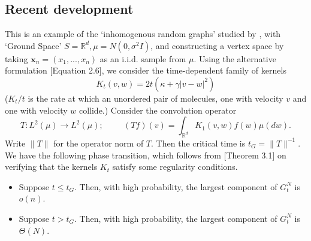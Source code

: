 \subsection{Recent development}
   This is an example of the `inhomogenous random graphs' studied by \cite{BJR07}, with `Ground Space' $S=\mathbb{R}^d, \mu=N(0,\sigma^2I)$, and constructing a vertex space by taking $\mathbf{x}_n=(x_1,...,x_n)$ as an i.i.d. sample from $\mu.$ Using the alternative formulation \cite{BJR07}[Equation 2.6], we consider the time-dependent family of kernels
   \begin{equation}
       K_t(v,w)=2t(\kappa+\gamma|v-w|^2)
   \end{equation}
   ($K_t/t$ is the rate at which an unordered pair of molecules, one with velocity $v$ and one with velocity $w$ collide.)
   Consider the convolution operator \begin{equation}\label{eq: T original}
       T: L^2(\mu)\rightarrow L^2(\mu); \hspace{1cm} (T f)(v)=\int_{\mathbb{R}^d} K_1(v,w)f(w)\mu(dw). 
   \end{equation} Write $\|T\|$ for the operator norm of $T$. Then the critical time is $t_G=\|T\|^{-1}.$ We have the following phase transition, which follows from \cite{BJR07}[Theorem 3.1] on verifying that the kernels $K_t$ satisfy some regularity conditions.  \begin{theorem} \begin{itemize}
       \item Suppose $t\leq t_G$. Then, with high probability, the largest component of $G^N_t$ is $o(n)$.
       \item Suppose $t>t_G.$ Then, with high probability, the largest component of $G^N_t$ is $\Theta(N)$.
   \end{itemize} \end{theorem} 
   \begin{lemma}\label{lemma: the one I haven't done yet}
     \end{lemma}